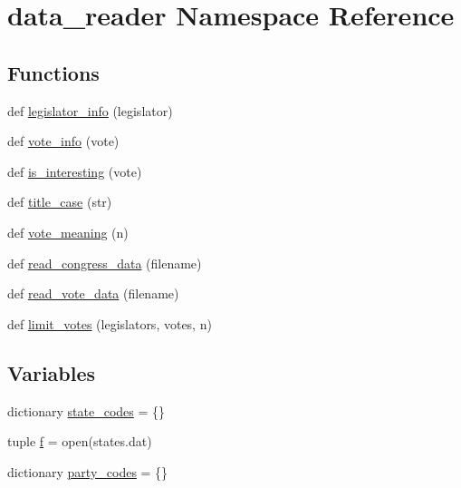 \hypertarget{namespacedata__reader}{}\section{data\+\_\+reader Namespace Reference}
\label{namespacedata__reader}
\subsection*{Functions}
\begin{DoxyCompactItemize}
\item 
def \hyperlink{namespacedata__reader_ae6d7a3d1c3644c57a762604d7521784f}{legislator\+\_\+info} (legislator)
\item 
def \hyperlink{namespacedata__reader_ab188bb279dfcad5668b987fb397d7ba0}{vote\+\_\+info} (vote)
\item 
def \hyperlink{namespacedata__reader_ac24e4a632575f7c91465a3d73e98a03f}{is\+\_\+interesting} (vote)
\item 
def \hyperlink{namespacedata__reader_ac06220b3282ef8191572b11f41906230}{title\+\_\+case} (str)
\item 
def \hyperlink{namespacedata__reader_ab92b8a5ad0aa41abcbbdc80203928d96}{vote\+\_\+meaning} (n)
\item 
def \hyperlink{namespacedata__reader_ac57e1cb4429cfcffa4b1dd88c7da4c4c}{read\+\_\+congress\+\_\+data} (filename)
\item 
def \hyperlink{namespacedata__reader_aa02be737061bc86dc492dcfca6d5b5c8}{read\+\_\+vote\+\_\+data} (filename)
\item 
def \hyperlink{namespacedata__reader_ab91ea6523c4ca764fb49f9fdfb1789cb}{limit\+\_\+votes} (legislators, votes, n)
\end{DoxyCompactItemize}
\subsection*{Variables}
\begin{DoxyCompactItemize}
\item 
dictionary \hyperlink{namespacedata__reader_ad3c1b3a1ac9c17a8a9901495e9c4ec36}{state\+\_\+codes} = \{\}
\item 
tuple \hyperlink{namespacedata__reader_ac080e983af4252f0809a2eb2b7a145eb}{f} = open(\textquotesingle{}states.\+dat\textquotesingle{})
\item 
dictionary \hyperlink{namespacedata__reader_a7afd821f0f05ccf8e869ee486962ba14}{party\+\_\+codes} = \{\}
\end{DoxyCompactItemize}


